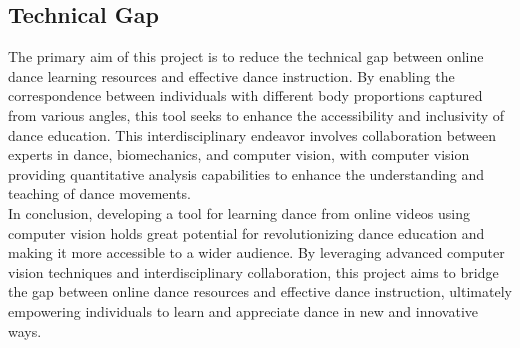 \subsection{Technical Gap}
\indent The primary aim of this project is to reduce the technical gap between online dance learning resources and 
effective dance instruction. By enabling the correspondence between individuals with different body proportions 
captured from various angles, this tool seeks to enhance the accessibility and inclusivity of dance education. 
This interdisciplinary endeavor involves collaboration between experts in dance, biomechanics, and computer 
vision, with computer vision providing quantitative analysis capabilities to enhance the understanding and 
teaching of dance movements.
\\
\indent In conclusion, developing a tool for learning dance from online videos using computer vision holds 
great potential for revolutionizing dance education and making it more accessible to a wider 
audience. By leveraging advanced computer vision techniques and interdisciplinary collaboration, 
this project aims to bridge the gap between online dance resources and effective dance instruction, 
ultimately empowering individuals to learn and appreciate dance in new and innovative ways.



